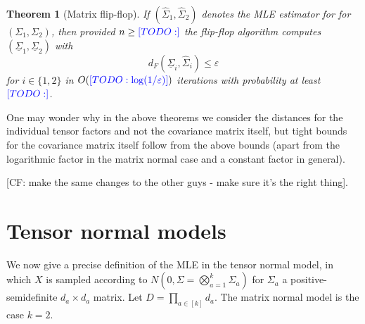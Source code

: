 \documentclass{article}
\newtheorem{theorem}{Theorem}
\newcommand\eps{\varepsilon}
\newcommand{\CF}[1]{{\color{purple}[CF: #1]}}
\newcommand{\TODO}[1]{{\color{blue}[TODO: #1]}}
\begin{document}
\begin{theorem}[Matrix flip-flop]\label{thm:matrix-flipflop} If $(\hat{\Sigma}_1, \hat{\Sigma}_2) $ denotes the MLE estimator for for $(\Sigma_1, \Sigma_2)$, then provided $n \geq \TODO{}$ the flip-flop algorithm computes $(\underline{\Sigma}_1, \underline{\Sigma}_2)$ with 
$$ d_F(\underline{\Sigma}_i, \hat{\Sigma}_i) \leq \eps $$
for $i \in \{1,2\}$ in $O(\TODO{\log(1/\eps)})$ iterations with probability at least $\TODO{}$.
\end{theorem}

One may wonder why in the above theorems we consider the distances for the individual tensor factors and not the covariance matrix itself, but tight bounds for the covariance matrix itself follow from the above bounds (apart from the logarithmic factor in the matrix normal case and a constant factor in general).

\CF{make the same changes to the other guys - make sure it's the right thing}.


\section{Tensor normal models}
We now give a precise definition of the MLE in the tensor normal model, in which $X$ is sampled according to $N(0, \Sigma = \bigotimes_{a = 1}^{k} \Sigma_a)$ for $\Sigma_a$ a positive-semidefinite $d_a\times d_a$ matrix. Let $D = \prod_{a \in [k]} d_a$. The matrix normal model is the case $k = 2$. 
\end{document}
